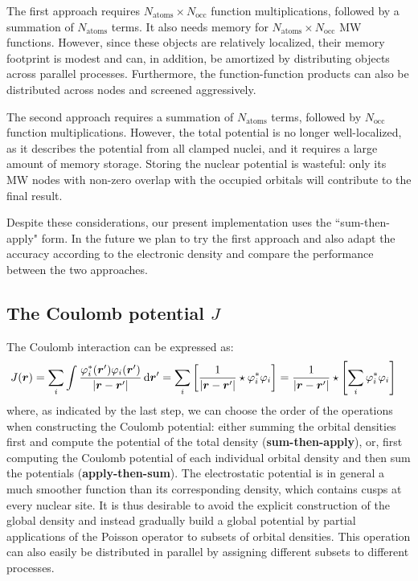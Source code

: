 \documentclass[journal=jctcce, manuscript=suppinfo]{achemso}
\begin{document}
The first approach requires $N_{\mathrm{atoms}}\times N_{\mathrm{occ}}$ function multiplications, followed by a summation of $N_{\mathrm{atoms}}$ terms. It also needs memory for $N_{\mathrm{atoms}}\times N_{\mathrm{occ}}$ \ac{MW} functions. However, since these objects are relatively localized, their memory footprint is modest and can, in addition, be amortized by distributing objects across parallel processes. Furthermore, the function-function products can also be distributed across nodes and screened aggressively.

The second approach requires a summation of $N_{\mathrm{atoms}}$ terms, followed by $N_{\mathrm{occ}}$ function multiplications. However, the total potential is no longer well-localized, as it describes the potential from all clamped nuclei, and it requires a large amount of memory storage. Storing the nuclear potential is wasteful: only its \ac{MW} nodes with non-zero overlap with the occupied orbitals will contribute to the final result.

Despite these considerations, our present implementation uses the ``sum-then-apply" form. In the future we plan to try the first approach and also adapt the accuracy according to the electronic density and compare the performance between the two approaches.


\subsection{The Coulomb potential $J$}\label{sec:compute-J}
The Coulomb interaction can be expressed as:
\begin{equation}
    \begin{aligned}
  J(\boldsymbol{r}) &= \sum_i \int \frac{\varphi^*_i(\boldsymbol{r}')\varphi_i(\boldsymbol{r}')}{|\boldsymbol{r}-\boldsymbol{r}'|} \, \mathrm{d}\boldsymbol{r}' =
  \sum_i  \left[
  \frac{1}{|\boldsymbol{r}-\boldsymbol{r}'|} \star 
  \varphi^*_i\varphi_i
  \right] =
  \frac{1}{|\boldsymbol{r}-\boldsymbol{r}'|} \star 
  \left[\sum_i 
  \varphi^*_i\varphi_i
  \right]
    \end{aligned}
\end{equation}
where, as indicated by the last step, we can choose the order of the operations when constructing the Coulomb potential: either summing the orbital densities first and compute the potential of the total density (\textbf{sum-then-apply}), or, first computing the Coulomb potential of each individual orbital density and then sum the potentials (\textbf{apply-then-sum}). The electrostatic potential is in general a much smoother function than its corresponding density, which contains cusps at every nuclear site. It is thus desirable to avoid the explicit construction of the global density and instead gradually build a global potential by partial applications of the Poisson operator to subsets of orbital densities. This operation can also easily be distributed in parallel by assigning different subsets to different processes.
\end{document}
